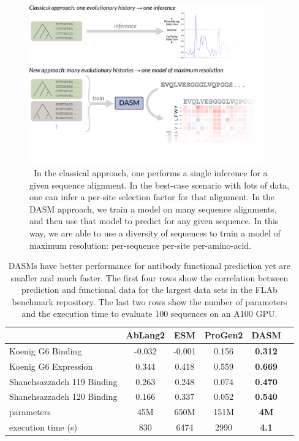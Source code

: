 \documentclass{article}
\begin{document}
\begin{figure}[h!]
\centering
\centerline{\includegraphics[width=0.9\textwidth]{figures/dasm-paradigm}}
\caption{\
In the classical approach, one performs a single inference for a given sequence alignment. 
In the best-case scenario with lots of data, one can infer a per-site selection factor for that alignment.
In the DASM approach, we train a model on many sequence alignments, and then use that model to predict for any given sequence.
In this way, we are able to use a diversity of sequences to train a model of maximum resolution: per-sequence per-site per-amino-acid.
}%
\label{fig:methods}
\end{figure}

\begin{table}[ht]
  \begin{center}
  \begin{tabular}{lccccc}
  & AbLang2 & ESM & ProGen2 & DASM \\
  \midrule
  Koenig G6 Binding & -0.032 & -0.001 & 0.156 & \textbf{0.312} \\
  Koenig G6 Expression & 0.344 & 0.418 & 0.559 & \textbf{0.669} \\
  Shanehsazzadeh 119 Binding & 0.263 & 0.248 & 0.074 & \textbf{0.470} \\
  Shanehsazzadeh 120 Binding & 0.166 & 0.337 & 0.052 & \textbf{0.540} \\
  \bottomrule
  parameters & 45M  & 650M & 151M & \textbf{4M} \\
  execution time (s) & 830 & 6474 & 2990 & \textbf{4.1} \\
  \bottomrule
  \end{tabular}
\end{center}
  \caption{%
  DASMs have better performance for antibody functional prediction yet are smaller and much faster.
  The first four rows show the correlation between prediction and functional data for the largest data sets in the FLAb benchmark repository.
  The last two rows show the number of parameters and the execution time to evaluate 100 sequences on an A100 GPU.
  }
  \label{tab:model-comparison}
\end{table}
\end{document}
